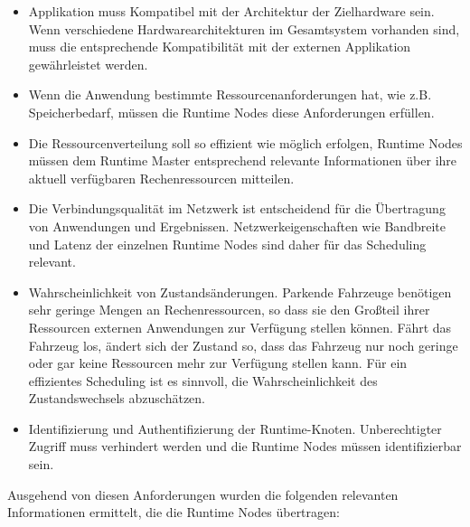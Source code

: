 \begin{itemize}
    \item Applikation muss Kompatibel mit der Architektur der Zielhardware sein. Wenn verschiedene Hardwarearchitekturen im Gesamtsystem vorhanden sind, muss die entsprechende Kompatibilität mit der externen Applikation gewährleistet werden. 
    \item Wenn die Anwendung bestimmte Ressourcenanforderungen hat, wie z.B. Speicherbedarf, müssen die Runtime Nodes diese Anforderungen erfüllen.
    \item Die Ressourcenverteilung soll so effizient wie möglich erfolgen, Runtime Nodes müssen dem Runtime Master entsprechend relevante Informationen über ihre aktuell verfügbaren Rechenressourcen mitteilen.
    \item Die Verbindungsqualität im Netzwerk ist entscheidend für die Übertragung von Anwendungen und Ergebnissen. Netzwerkeigenschaften wie Bandbreite und Latenz der einzelnen Runtime Nodes sind daher für das Scheduling relevant.
    \item Wahrscheinlichkeit von Zustandsänderungen. Parkende Fahrzeuge benötigen sehr geringe Mengen an Rechenressourcen, so dass sie den Großteil ihrer Ressourcen externen Anwendungen zur Verfügung stellen können. Fährt das Fahrzeug los, ändert sich der Zustand so, dass das Fahrzeug nur noch geringe oder gar keine Ressourcen mehr zur Verfügung stellen kann. Für ein effizientes Scheduling ist es sinnvoll, die Wahrscheinlichkeit des Zustandswechsels abzuschätzen.
    \item Identifizierung und Authentifizierung der Runtime-Knoten. Unberechtigter Zugriff muss verhindert werden und die Runtime Nodes müssen identifizierbar sein.
\end{itemize}

Ausgehend von diesen Anforderungen wurden die folgenden relevanten Informationen ermittelt, die die Runtime Nodes übertragen:

